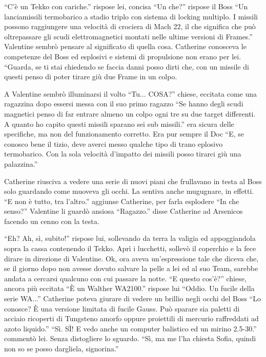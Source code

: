     ``C'è un Tekko con cariche.'' rispose lei, concisa ``Un che?'' rispose il Boss ``Un lanciamissili termobarico a stadio triplo con
    sistema di locking multiplo. I missili possono raggiungere una velocità di crociera di Mach 22, il che significa che
    può oltrepassare gli scudi elettromagnetici montati nelle ultime versioni di Frames.'' Valentine sembrò pensare al
    significato di quella cosa. Catherine conosceva le competenze del Boss ed esplosivi e sistemi di propulsione non
    erano per lei. ``Guarda, se ti stai chiedendo se faccia danni posso dirti che, con un missile di questi penso di
    poter tirare giù due Frame in un colpo.

    A Valentine sembrò illuminarsi il volto ``Tu... COSA?'' chiese, eccitata come una ragazzina dopo essersi messa con
    il suo primo ragazzo ``Se hanno degli scudi magnetici penso di far entrare almeno un colpo ogni tre su due target
    differenti. A quanto ho capito questi missili sparano sei sub missili.'' era sicura delle specifiche, ma non del
    funzionamento corretto. Era pur sempre il Doc ``E, se conosco bene il tizio, deve averci messo qualche tipo di trano
    eplosivo termobarico. Con la sola velocità d'impatto dei missili posso tirarci giù una palazzina.''

    Catherine riusciva a vedere una serie di nuovi piani che frullavano in testa al Boss solo guardando come muoveva gli
    occhi. La sentiva anche mugugnare, in effetti. ``E non è tutto, tra l'altro.'' aggiunse Catherine, per farla
    esplodere ``In che senso?'' Valentine li guardò ansiosa ``Ragazzo.'' disse Catherine ad Arsenicos facendo un cenno
    con la testa.

    ``Eh? Ah, sì, subito!'' rispose lui, sollevando da terra la valigia ed appoggiandola sopra la cassa contenendo il
    Tekko. Aprì i lucchetti, sollevò il coperchio e la fece dirare in direzione di Valentine. Ok, ora aveva
    un'espressione tale che diceva che, se il giorno dopo non avesse dovuto salvare la pelle a lei ed al suo Team,
    sarebbe andata a cercarsi qualcuno con cui passare la notte. ``E questo cos'è?'' chiese, ancora più eccitata ``È un
    Walther WA2100.'' rispose lui ``Oddio. Un fucile della serie WA...'' Catherine poteva giurare di vedere un brillio
    negli occhi del Boss ``Lo conosce? È una versione limitata di fucile Gauss. Può sparare sia paletti di acciaio
    ricoperti di Tungsteno amorfo oppure proiettili di mercurio raffreddati ad azoto liquido.'' ``Sì. SÌ! E vedo anche
    un computer balistico ed un mirino 2.5-30.'' commentò lei. Senza distogliere lo sguardo. ``Sì, ma me l'ha chiesta
    Sofia, quindi non so se posso dargliela, signorina.''

